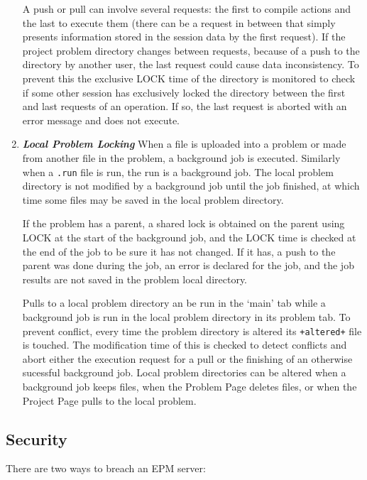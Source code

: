 \documentclass[12pt]{article}
\newcommand{\key}[1]{{\bf \em #1}}
\begin{document}
\begin{enumerate}
A push or pull can involve several requests:
the first to compile actions and the last to execute them
(there can be a request in between that simply presents
information stored in the session data by the first request).
If the project problem directory changes between requests,
because of a push to the directory by another user, the last
request could cause data inconsistency.  To prevent this
the exclusive LOCK time of the directory is monitored to check if some
other session has exclusively locked the directory between the
first and last requests of an operation.
If so, the last request is aborted with an error message and
does not execute.

\item \key{Local Problem Locking}
When a file is uploaded into a problem or made from another file
in the problem, a background job is executed.
Similarly when a {\tt .run} file is run, the run is a background job.
The local problem directory is not modified by a background job
until the job finished, at which time some files may be saved in
the local problem directory.

If the problem has a parent, a shared lock is
obtained on the parent using LOCK at the start of the background
job, and the LOCK time is checked at the end of the job to be sure
it has not changed.  If it has, a push to the parent was done
during the job, an error is declared for the job,
and the job results are not saved in the problem local directory.


Pulls to a local problem directory an be run in the `main' tab
while a background job is run in the local problem directory in
its problem tab.  To prevent conflict, every time the problem
directory is altered its {\tt +altered+} file is touched.
The modification time of this is checked to detect conflicts
and abort either the execution request for a pull or the
finishing of an otherwise sucessful background job.
Local problem directories can be altered when a background
job keeps files, when the Problem Page deletes files, or when
the Project Page pulls to the local problem.


\end{enumerate}


\subsection{Security}

There are two ways to breach an EPM server:
\end{document}

